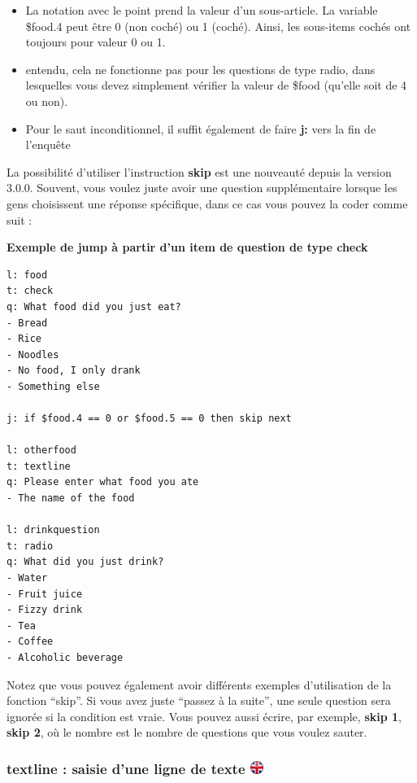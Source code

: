 \documentclass[
]{book}
\providecommand{\tightlist}{%
  \setlength{\itemsep}{0pt}\setlength{\parskip}{0pt}}
\begin{document}
\begin{itemize}
\tightlist
\item
  La notation avec le point prend la valeur d'un sous-article. La variable \$food.4 peut être 0 (non coché) ou 1 (coché). Ainsi, les sous-items cochés ont toujours pour valeur 0 ou 1.
\item
  entendu, cela ne fonctionne pas pour les questions de type radio, dans lesquelles vous devez simplement vérifier la valeur de \$food (qu'elle soit de 4 ou non).
\item
  Pour le saut inconditionnel, il suffit également de faire \textbf{j:} vers la fin de l'enquête
\end{itemize}

La possibilité d'utiliser l'instruction \textbf{skip} est une nouveauté depuis la version 3.0.0. Souvent, vous voulez juste avoir une question supplémentaire lorsque les gens choisissent une réponse spécifique, dans ce cas vous pouvez la coder comme suit :

\textbf{Exemple de jump à partir d'un item de question de type check}

\begin{verbatim}
l: food
t: check
q: What food did you just eat?
- Bread
- Rice
- Noodles
- No food, I only drank
- Something else

j: if $food.4 == 0 or $food.5 == 0 then skip next

l: otherfood
t: textline
q: Please enter what food you ate
- The name of the food

l: drinkquestion
t: radio
q: What did you just drink?
- Water
- Fruit juice
- Fizzy drink
- Tea
- Coffee
- Alcoholic beverage
\end{verbatim}

Notez que vous pouvez également avoir différents exemples d'utilisation de la fonction ``skip''. Si vous avez juste ``passez à la suite'', une seule question sera ignorée si la condition est vraie. Vous pouvez aussi écrire, par exemple, \textbf{skip 1}, \textbf{skip 2}, où le nombre est le nombre de questions que vous voulez sauter.

\hypertarget{textline-saisie-dune-ligne-de-texte}{%
\subsubsection[textline : saisie d'une ligne de texte ]{\texorpdfstring{textline : saisie d'une ligne de texte \href{https://www.psytoolkit.org/doc3.1.0/online-survey-syntax.html\#textline}{\protect\includegraphics{img/ukflag.png}}}{textline : saisie d'une ligne de texte }}\label{textline-saisie-dune-ligne-de-texte}}
\end{document}
